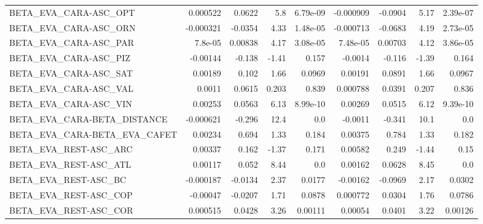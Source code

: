 \begin{tabular}{lrrrrrrrr}
BETA\_EVA\_CARA-ASC\_OPT                  &    0.000522 &       0.0622 &     5.8 & 6.79e-09 &  -0.000909 &     -0.0904 &         5.17 &      2.39e-07 \\
BETA\_EVA\_CARA-ASC\_ORN                  &   -0.000321 &      -0.0354 &    4.33 & 1.48e-05 &  -0.000713 &     -0.0683 &         4.19 &      2.73e-05 \\
BETA\_EVA\_CARA-ASC\_PAR                  &     7.8e-05 &      0.00838 &    4.17 & 3.08e-05 &   7.48e-05 &     0.00703 &         4.12 &      3.86e-05 \\
BETA\_EVA\_CARA-ASC\_PIZ                  &    -0.00144 &       -0.138 &   -1.41 &    0.157 &    -0.0014 &      -0.116 &        -1.39 &         0.164 \\
BETA\_EVA\_CARA-ASC\_SAT                  &     0.00189 &        0.102 &    1.66 &   0.0969 &    0.00191 &      0.0891 &         1.66 &        0.0967 \\
BETA\_EVA\_CARA-ASC\_VAL                  &      0.0011 &       0.0615 &   0.203 &    0.839 &   0.000788 &      0.0391 &        0.207 &         0.836 \\
BETA\_EVA\_CARA-ASC\_VIN                  &     0.00253 &       0.0563 &    6.13 & 8.99e-10 &    0.00269 &      0.0515 &         6.12 &      9.39e-10 \\
BETA\_EVA\_CARA-BETA\_DISTANCE            &   -0.000621 &       -0.296 &    12.4 &      0.0 &    -0.0011 &      -0.341 &         10.1 &           0.0 \\
BETA\_EVA\_CARA-BETA\_EVA\_CAFET           &     0.00234 &        0.694 &    1.33 &    0.184 &    0.00375 &       0.784 &         1.33 &         0.182 \\
BETA\_EVA\_REST-ASC\_ARC                  &     0.00337 &        0.162 &   -1.37 &    0.171 &    0.00582 &       0.249 &        -1.44 &          0.15 \\
BETA\_EVA\_REST-ASC\_ATL                  &     0.00117 &        0.052 &    8.44 &      0.0 &    0.00162 &      0.0628 &         8.45 &           0.0 \\
BETA\_EVA\_REST-ASC\_BC                   &   -0.000187 &      -0.0134 &    2.37 &   0.0177 &   -0.00162 &     -0.0969 &         2.17 &        0.0302 \\
BETA\_EVA\_REST-ASC\_COP                  &    -0.00047 &      -0.0207 &    1.71 &   0.0878 &   0.000772 &      0.0304 &         1.76 &        0.0786 \\
BETA\_EVA\_REST-ASC\_COR                  &    0.000515 &       0.0428 &    3.26 &  0.00111 &    0.00054 &      0.0401 &         3.22 &       0.00126 \\

\end{tabular}
